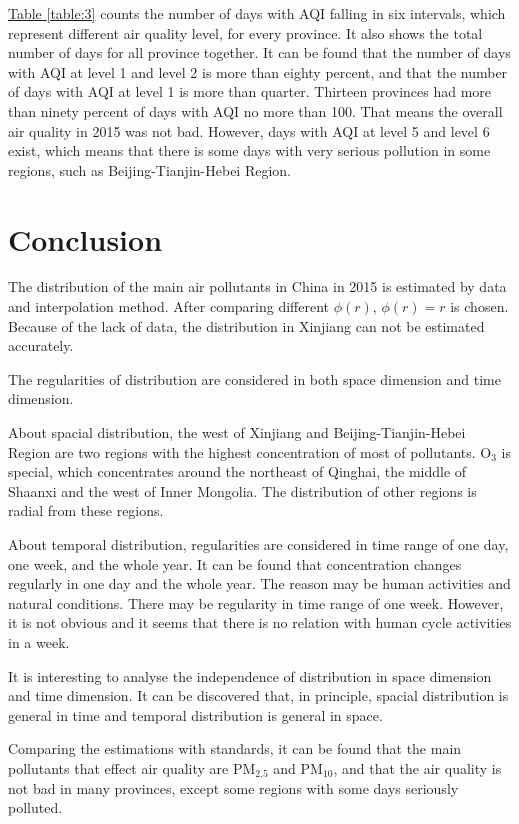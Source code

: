 \documentclass[letterpaper]{article}
\begin{document}
\begin{CJK*}{UTF8}{gkai}
\hyperref[table:3]{Table \ref*{table:3}} counts the number of days with AQI falling in six intervals, which represent different air quality level, for every province. It also shows the total number of days for all province together. It can be found that the number of days with AQI at level 1 and level 2 is more than eighty percent, and that the number of days with AQI at level 1 is more than quarter. Thirteen provinces had more than ninety percent of days with AQI no more than 100. That means the overall air quality in 2015 was not bad. However, days with AQI at level 5 and level 6 exist, which means that there is some days with very serious pollution in some regions, such as Beijing-Tianjin-Hebei Region.

\section{Conclusion}

The distribution of the main air pollutants in China in 2015 is estimated by data and interpolation method. After comparing different $\phi(r)$, $\phi(r)=r$ is chosen. Because of the lack of data, the distribution in Xinjiang can not be estimated accurately.

The regularities of distribution are considered in both space dimension and time dimension.

About spacial distribution, the west of Xinjiang and Beijing-Tianjin-Hebei Region are two regions with the highest concentration of most of pollutants. O$_{3}$ is special, which concentrates around the northeast of Qinghai, the middle of Shaanxi and the west of Inner Mongolia. The distribution of other regions is radial from these regions.

About temporal distribution, regularities are considered in time range of one day, one week, and the whole year. It can be found that concentration changes regularly in one day and the whole year. The reason may be human activities and natural conditions. There may be regularity in time range of one week. However, it is not obvious and it seems that there is no relation with human cycle activities in a week.

It is interesting to analyse the independence of distribution in space dimension and time dimension. It can be discovered that, in principle, spacial distribution is general in time and temporal distribution is general in space.

Comparing the estimations with standards, it can be found that the main pollutants that effect air quality are PM$_{2.5}$ and PM$_{10}$, and that the air quality is not bad in many provinces, except some regions with some days seriously polluted.



\end{CJK*}
\end{document}
